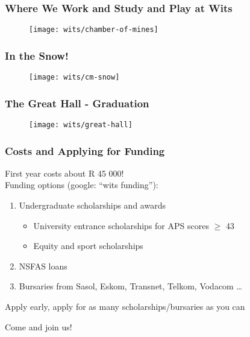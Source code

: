 \documentclass{beamer}
\begin{document}
\begin{frame}
  \frametitle{Where We Work and Study and Play at Wits}
  \begin{figure}
  \centering
  \texttt{[image: wits/chamber-of-mines]}
  \end{figure}
\end{frame}

\begin{frame}
  \frametitle{In the Snow!}
  \begin{figure}
  \centering
  \texttt{[image: wits/cm-snow]}
  \end{figure}
\end{frame}

\begin{frame}
  \frametitle{The Great Hall - Graduation}
  \begin{figure}
  \centering
  \texttt{[image: wits/great-hall]}
  \end{figure}
\end{frame}

\begin{frame}
\frametitle{Costs and Applying for Funding}
 First year costs about \alert{R 45 000!}\\
\vspace{3mm}
 Funding options (google: ``wits funding''):
  \begin{enumerate}
    \item Undergraduate scholarships and awards
    \begin{itemize}
    \item University entrance scholarships for APS scores $\geq$ 43
    \item Equity and sport scholarships
    \end{itemize}
    \item NSFAS loans
    \item Bursaries from Sasol, Eskom, Transnet, Telkom, Vodacom \dots
  \end{enumerate}
  \vspace{3mm}
  Apply early, apply for as many scholarships/bursaries as you can
\end{frame}

\begin{frame}[plain,c]
\begin{center}
\Huge Come and join us!
\end{center}
\end{frame}
\end{document}
